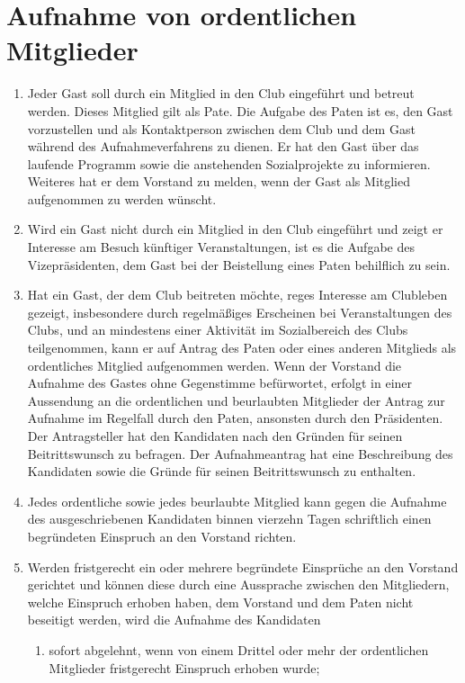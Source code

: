 \documentclass{article}
\begin{document}
\section{Aufnahme von ordentlichen Mitglieder}
\begin{enumerate}
    \item Jeder Gast soll durch ein Mitglied in den Club eingeführt und betreut werden. Dieses Mitglied gilt als Pate. Die Aufgabe des Paten ist es, den Gast vorzustellen und als Kontaktperson zwischen dem Club und dem Gast während des Aufnahmeverfahrens zu dienen. Er hat den Gast über das laufende Programm sowie die anstehenden Sozialprojekte zu informieren. Weiteres hat er dem Vorstand zu melden, wenn der Gast als Mitglied aufgenommen zu werden wünscht.
    \item Wird ein Gast nicht durch ein Mitglied in den Club eingeführt und zeigt er Interesse am Besuch künftiger Veranstaltungen, ist es die Aufgabe des Vizepräsidenten, dem Gast bei der Beistellung eines Paten behilflich zu sein.
    \item Hat ein Gast, der dem Club beitreten möchte, reges Interesse am Clubleben gezeigt, insbesondere durch regelmäßiges Erscheinen bei Veranstaltungen des Clubs, und an mindestens einer Aktivität im Sozialbereich des Clubs teilgenommen, kann er auf Antrag des Paten oder eines anderen Mitglieds als ordentliches Mitglied aufgenommen werden. Wenn der Vorstand die Aufnahme des Gastes ohne Gegenstimme befürwortet, erfolgt in einer Aussendung an die ordentlichen und beurlaubten Mitglieder der Antrag zur Aufnahme im Regelfall durch den Paten, ansonsten durch den Präsidenten. Der Antragsteller hat den Kandidaten nach den Gründen für seinen Beitrittswunsch zu befragen. Der Aufnahmeantrag hat eine Beschreibung des Kandidaten sowie die Gründe für seinen Beitrittswunsch zu enthalten.
    \item Jedes ordentliche sowie jedes beurlaubte Mitglied kann gegen die Aufnahme des ausgeschriebenen Kandidaten binnen vierzehn Tagen schriftlich einen begründeten Einspruch an den Vorstand richten.
    \item Werden fristgerecht ein oder mehrere begründete Einsprüche an den Vorstand gerichtet und können diese durch eine Aussprache zwischen den Mitgliedern, welche Einspruch erhoben haben, dem Vorstand und dem Paten nicht beseitigt werden, wird die Aufnahme des Kandidaten
    \begin{enumerate}
        \item sofort abgelehnt, wenn von einem Drittel oder mehr der ordentlichen Mitglieder fristgerecht Einspruch erhoben wurde;

\end{enumerate}
\end{enumerate}
\end{document}
